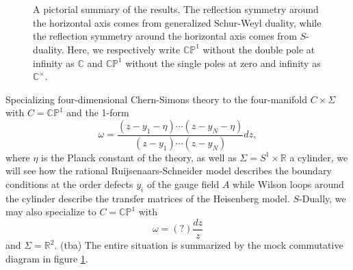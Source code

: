 \documentclass[11pt]{report}
\theoremstyle{definition}
\theoremstyle{remark}
\theoremstyle{remark}
\newcommand{\R}{\mathbb{R}}
\newcommand{\C}{\mathbb{C}}
\newcommand{\CP}{\mathbb{CP}}
\begin{document}
\begin{figure}
\begin{center}
~\\~\\
\end{center}
\caption{A pictorial summary of the results. The reflection symmetry around the horizontal axis comes from generalized Schur-Weyl duality, while the reflection symmetry around the horizontal axis comes from $S$-duality. Here, we respectively write $\CP^1$ without the double pole at infinity as $\C$ and $\CP^1$ without the single poles at zero and infinity as $\C^\times$.}
\label{figure:dualities}
\end{figure}

Specializing four-dimensional Chern-Simons theory to the four-manifold $C \times \Sigma$ with $C = \CP^1$ and the 1-form
\begin{equation*}
\omega = \frac{(z-y_1-\eta) \cdots (z-y_N-\eta)}{(z-y_1) \cdots (z-y_N)} dz,
\end{equation*}
where $\eta$ is the Planck constant of the theory, as well as $\Sigma = S^1 \times \R$ a cylinder, we will see how the rational Ruijsenaars-Schneider model describes the boundary conditions at the order defects $y_i$ of the gauge field $A$ while Wilson loops around the cylinder describe the transfer matrices of the Heisenberg model. $S$-Dually, we may also specialize to $C = \CP^1$ with
\begin{equation*}
\omega = (?) \frac{dz}{z}
\end{equation*}
and $\Sigma = \R^2$. (tba) The entire situation is summarized by the mock commutative diagram in figure \ref{figure:dualities}.
\end{document}
